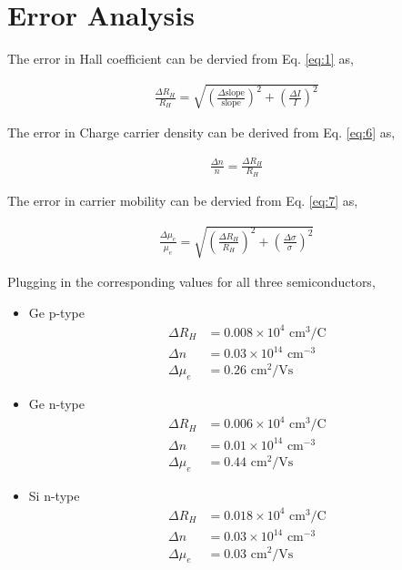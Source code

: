 \section{Error Analysis}

The error in Hall coefficient can be dervied from Eq. \ref{eq:1} as,

\begin{align}
    \frac{\Delta R_H}{R_H} = \sqrt{\left(\frac{\Delta\text{slope}}{\text{slope}}\right)^2 + \left(\frac{\Delta I}{I}\right)^2}
\end{align}

The error in Charge carrier density can be derived from Eq. \ref{eq:6} as,

\begin{align}
    \frac{\Delta n}{n} = \frac{\Delta R_H}{R_H}
\end{align}

The error in carrier mobility can be dervied from Eq. \ref{eq:7} as, 

\begin{align}
    \frac{\Delta \mu_e}{\mu_e} = \sqrt{\left(\frac{\Delta R_H}{R_H}\right)^2 + \left(\frac{\Delta \sigma}{\sigma}\right)^2}
\end{align}

Plugging in the corresponding values for all three semiconductors,\\

\begin{itemize}
    \item Ge p-type
    \begin{align*}
        \Delta R_H &= 0.008 \times 10^4 \text{ cm}^3/\text{C}\\
        \Delta n &= 0.03 \times 10^{14} \text{ cm}^{-3}\\
        \Delta \mu_e &= 0.26 \text{ cm}^2/\text{Vs}
    \end{align*}
    \item Ge n-type
    \begin{align*}
        \Delta R_H &= 0.006 \times 10^4 \text{ cm}^3/\text{C}\\
        \Delta n &= 0.01 \times 10^{14} \text{ cm}^{-3}\\
        \Delta \mu_e &= 0.44 \text{ cm}^2/\text{Vs}
    \end{align*}
    \item Si n-type
    \begin{align*}
        \Delta R_H &= 0.018 \times 10^4 \text{ cm}^3/\text{C}\\
        \Delta n &= 0.03 \times 10^{14} \text{ cm}^{-3}\\
        \Delta \mu_e &= 0.03 \text{ cm}^2/\text{Vs}
    \end{align*}
\end{itemize}




